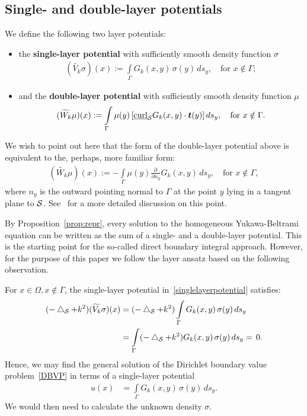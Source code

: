 \subsection{Single- and double-layer potentials}
We define the following two layer potentials:
\begin{itemize}
\item the {\bf single-layer potential} with sufficiently smooth density
function $\sigma$
  \begin{align}
    (\widetilde{V_k}\sigma)(x):=\int\limits_{\Gamma}
    G_k(x,y)\,\sigma(y)\,ds_y,\quad\mbox{for $x \notin \Gamma$};
    \label{singlelayerpotential}
  \end{align}
\item and the {\bf double-layer potential} with sufficiently smooth
density function $\mu$
  \begin{align}
    (\widetilde{W_k}\mu )(x):=\int\limits_{\Gamma}
    \mu(y)\,[\underline{\mbox{curl}}_{\S} G_k(x,y)\cdot \vec{t}(y)]\,
    ds_y, \quad\mbox{for $x\notin\Gamma$}.
    \label{doublelayerpotential}
  \end{align}
\end{itemize}
We wish to point out here that the form of the double-layer potential above is equivalent to the, perhaps, more familiar form:
\begin{align*}
  (\widetilde{W_k}\mu )(x):=-\int\limits_{\Gamma}
  \mu(y) \frac{\partial \,}{\partial n_y} G_k(x,y) \,
  ds_y, \quad\mbox{for $x\notin\Gamma$},
\end{align*}
where $n_{y}$ is the outward pointing normal to $\Gamma$ at the point
$y$ lying in a tangent plane to $\S$.  See~\cite{kro:nig2013} for a
more detailed discussion on this point.

By Proposition~\ref{prop:repr}, every solution to the homogeneous
Yukawa-Beltrami equation can be written as the sum of a single- and a
double-layer potential.  This  is the starting point for the so-called
direct boundary integral approach. However, for the purpose of this
paper we follow the layer ansatz based on the following observation.

For $x \in \Omega, x \notin \Gamma$, the single-layer potential
in~\eqref{singlelayerpotential} satisfies:
\begin{align*}
  (-\lap_{\S} + k^{2}) (\widetilde{V_k}\sigma)(x)& =
  (-\lap_{\S} + k^2) \int\limits_\Gamma G_k(x,y)\, \sigma(y)\,ds_{y} \\
  & = \int\limits_\Gamma (-\lap_{\S}+k^2) G_k(x,y)\, 
    \sigma(y)\,ds_{y}= \, 0.
\end{align*}
Hence, we may find the general solution of the Dirichlet boundary value
problem~\eqref{DBVP} in terms of a single-layer potential
\begin{align*}
  u(x) & =  \int\limits_\Gamma G_k(x,y) \,\sigma(y) \,ds_{y}. 
\end{align*}
We would then need to calculate the unknown density $\sigma$.
 
